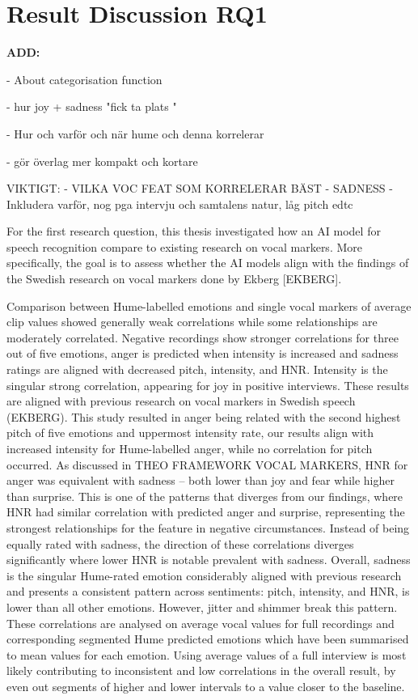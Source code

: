 \section{Result Discussion RQ1}

\textbf{ADD:}

- About categorisation function 

- hur joy + sadness "fick ta plats " 

- Hur och varför och när hume och denna korrelerar 

- gör överlag mer kompakt och kortare 

VIKTIGT: 
- VILKA VOC FEAT SOM KORRELERAR BÄST - SADNESS - Inkludera varför, nog pga intervju och samtalens natur, låg pitch edtc 

\medskip

For the first research question, this thesis investigated how an AI model for speech recognition
compare to existing research on vocal markers. More specifically, the goal is to assess whether
the AI models align with the findings of the Swedish research on vocal markers done by Ekberg
[EKBERG]. 

Comparison between Hume-labelled emotions and single vocal markers of average clip values showed generally weak correlations while some relationships are moderately correlated. 
Negative recordings show stronger correlations for three out of five emotions, anger is predicted when intensity is increased and sadness ratings are aligned with decreased pitch, intensity, and HNR. 
Intensity is the singular strong correlation, appearing for joy in positive interviews. These results are aligned with previous research on vocal markers in 
Swedish speech (EKBERG). This study resulted in anger being related with the second highest pitch of five emotions and uppermost intensity rate, 
our results align with increased intensity for Hume-labelled anger, while no correlation for pitch occurred. As discussed in THEO FRAMEWORK VOCAL MARKERS, HNR for anger was equivalent with sadness $–$ both lower than joy and fear while higher than surprise. 
This is one of the patterns that diverges from our findings, where HNR had similar correlation with predicted anger and surprise, representing the strongest relationships for the feature in negative circumstances. Instead of being equally rated with sadness, 
the direction of these correlations diverges significantly where lower HNR is notable prevalent with sadness. Overall, sadness is the singular Hume-rated emotion considerably aligned with previous research and presents a consistent pattern across sentiments: 
pitch, intensity, and HNR, is lower than all other emotions. However, jitter and shimmer break this pattern. These correlations are analysed on average vocal values for full recordings and corresponding segmented Hume predicted emotions which have been summarised to mean values for each emotion. 
Using average values of a full interview is most likely contributing to inconsistent and low correlations in the overall result, by even out segments of higher and lower intervals to a value closer to the baseline.   

